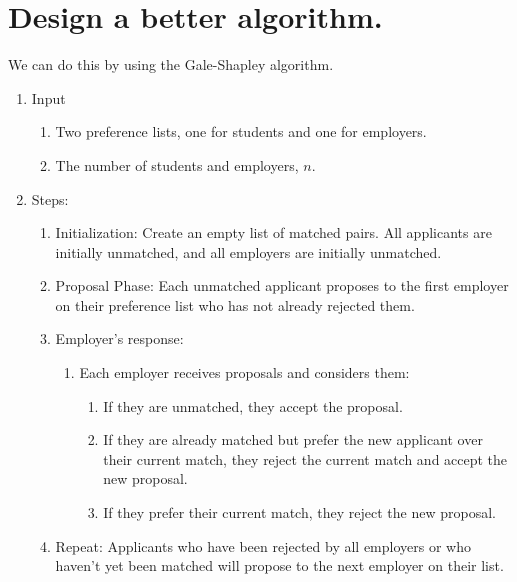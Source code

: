 \documentclass[12pt]{article}
\begin{document}
\section{Design a better algorithm.}
    We can do this by using the Gale-Shapley algorithm.
    \begin{enumerate}
        \item Input 
            \begin{enumerate}
                \item Two preference lists, one for students and one for employers.
                \item The number of students and employers, $n$.
            \end{enumerate}
        \item Steps:
            \begin{enumerate}
                \item Initialization: Create an empty list of matched pairs. 
                All applicants are initially unmatched, and all 
                employers are initially unmatched.
                \item Proposal Phase: Each unmatched applicant proposes to the 
                first employer on their preference list who has not already rejected them.
                \item Employer's response:
                    \begin{enumerate}
                        \item Each employer receives proposals and considers them:
                        \begin{enumerate}[-]
                            \item If they are unmatched, they accept the proposal.
                            \item If they are already matched but prefer 
                            the new applicant over their current match, 
                            they reject the current match and accept the new proposal.
                            \item If they prefer their current match, they reject the new proposal.
                        \end{enumerate}
                    \end{enumerate}
                \item Repeat: Applicants who have been rejected by all employers or who haven't 
                yet been matched will propose to the next employer on their list.

\end{enumerate}
\end{enumerate}
\end{document}

